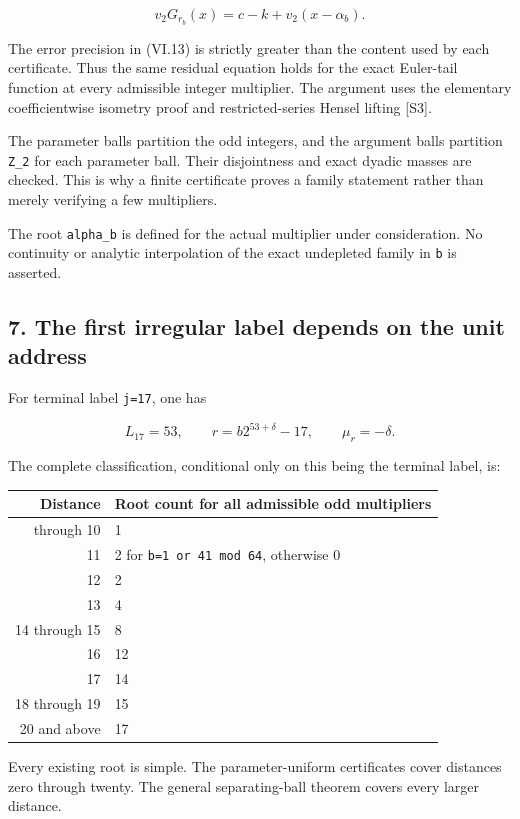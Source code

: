 \documentclass[11pt,letterpaper]{article}
\begin{document}
\[
\boxed{v_2G_{r_b}(x)=c-k+v_2(x-\alpha_b).} \tag{VI.15}
\]

The error precision in (VI.13) is strictly greater than the content used by each certificate. Thus the same residual equation holds for the exact Euler-tail function at every admissible integer multiplier. The argument uses the elementary coefficientwise isometry proof and restricted-series Hensel lifting {[}S3{]}.

The parameter balls partition the odd integers, and the argument balls partition \texttt{Z\_2} for each parameter ball. Their disjointness and exact dyadic masses are checked. This is why a finite certificate proves a family statement rather than merely verifying a few multipliers.

The root \texttt{alpha\_b} is defined for the actual multiplier under consideration. No continuity or analytic interpolation of the exact undepleted family in \texttt{b} is asserted.

\subsection{7. The first irregular label depends on the unit address}\label{the-first-irregular-label-depends-on-the-unit-address}

For terminal label \texttt{j=17}, one has

\[
L_{17}=53,\qquad r=b2^{53+\delta}-17,\qquad\mu_r=-\delta.
\]

The complete classification, conditional only on this being the terminal label, is:

\begin{longtable}[]{@{}rl@{}}
\toprule\noalign{}
Distance & Root count for all admissible odd multipliers \\
\midrule\noalign{}
\endhead
\bottomrule\noalign{}
\endlastfoot
0 through 10 & 1 \\
11 & 2 for \texttt{b=1\ or\ 41\ mod\ 64}, otherwise 0 \\
12 & 2 \\
13 & 4 \\
14 through 15 & 8 \\
16 & 12 \\
17 & 14 \\
18 through 19 & 15 \\
20 and above & 17 \\
\end{longtable}

Every existing root is simple. The parameter-uniform certificates cover distances zero through twenty. The general separating-ball theorem covers every larger distance.
\end{document}
